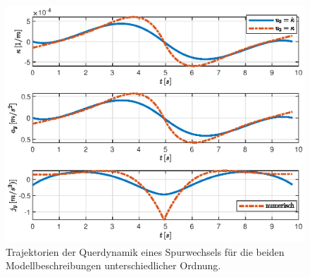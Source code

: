 \begin{figure}[h] 
	\centering
	\includegraphics[width=0.9\linewidth]{./Bilder/Ergebnisse/Geradeausfahrt/Spurwechsel/lat_dyn_s300_v30_ohne_dkappa.eps}
	\caption{Trajektorien der Querdynamik eines Spurwechsels für die beiden Modellbeschreibungen unterschiedlicher Ordnung.}
	\label{fig:lat_dyn_s300_v30_ohne_dkappa}
\end{figure} 
